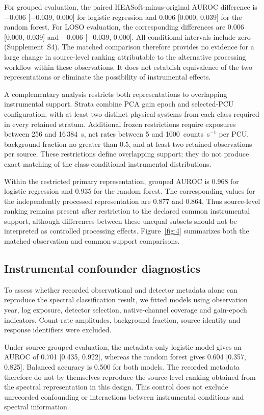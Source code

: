 \documentclass[final,5p,authoryear,nopreprintline]{elsarticle}
\begin{document}
For grouped evaluation, the paired HEASoft-minus-original AUROC difference is $-0.006$ [$-0.039$, 0.000] for logistic regression and 0.006 [0.000, 0.039] for the random forest. For LOSO evaluation, the corresponding differences are 0.006 [0.000, 0.039] and $-0.006$ [$-0.039$, 0.000]. All conditional intervals include zero (Supplement~S4). The matched comparison therefore provides no evidence for a large change in source-level ranking attributable to the alternative processing workflow within these observations. It does not establish equivalence of the two representations or eliminate the possibility of instrumental effects.

A complementary analysis restricts both representations to overlapping instrumental support. Strata combine PCA gain epoch and selected-PCU configuration, with at least two distinct physical systems from each class required in every retained stratum. Additional frozen restrictions require exposures between 256 and 16\,384~s, net rates between 5 and 1000~counts~s$^{-1}$ per PCU, background fraction no greater than 0.5, and at least two retained observations per source. These restrictions define overlapping support; they do not produce exact matching of the class-conditional instrumental distributions.

Within the restricted primary representation, grouped AUROC is 0.968 for logistic regression and 0.935 for the random forest. The corresponding values for the independently processed representation are 0.877 and 0.864. Thus source-level ranking remains present after restriction to the declared common instrumental support, although differences between these unequal subsets should not be interpreted as controlled processing effects. Figure~\ref{fig:4} summarizes both the matched-observation and common-support comparisons.

\subsection{Instrumental confounder diagnostics}

To assess whether recorded observational and detector metadata alone can reproduce the spectral classification result, we fitted models using observation year, log exposure, detector selection, native-channel coverage and gain-epoch indicators. Count-rate amplitudes, background fraction, source identity and response identifiers were excluded.

Under source-grouped evaluation, the metadata-only logistic model gives an AUROC of 0.701 [0.435, 0.922], whereas the random forest gives 0.604 [0.357, 0.825]. Balanced accuracy is 0.500 for both models. The recorded metadata therefore do not by themselves reproduce the source-level ranking obtained from the spectral representation in this design. This control does not exclude unrecorded confounding or interactions between instrumental conditions and spectral information.
\end{document}
